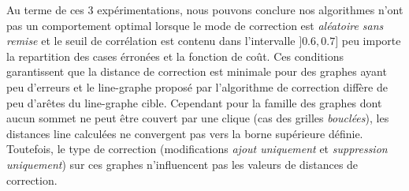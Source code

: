%

Au terme de ces $3$ exp\'erimentations, nous pouvons conclure nos algorithmes n'ont pas un comportement optimal lorsque le mode de correction est {\em al\'eatoire sans remise}  et le seuil de corr\'elation est contenu dans l'intervalle $]0.6,0.7]$ peu importe la repartition des cases \'erron\'ees et la fonction de co\^ut. 
Ces conditions garantissent que la distance de correction est minimale pour des graphes ayant peu d'erreurs et le line-graphe propos\'e par l'algorithme de correction diff\`ere de peu d'ar\^etes du line-graphe cible. 
 Cependant pour la famille des graphes dont aucun sommet ne peut \^etre couvert par une clique (cas des grilles {\em boucl\'ees}),  les distances line calcul\'ees ne convergent pas vers la borne sup\'erieure d\'efinie. Toutefois, le type de correction (modifications {\em ajout uniquement} et {\em suppression uniquement}) sur ces graphes n'influencent pas les valeurs de distances de correction. 


